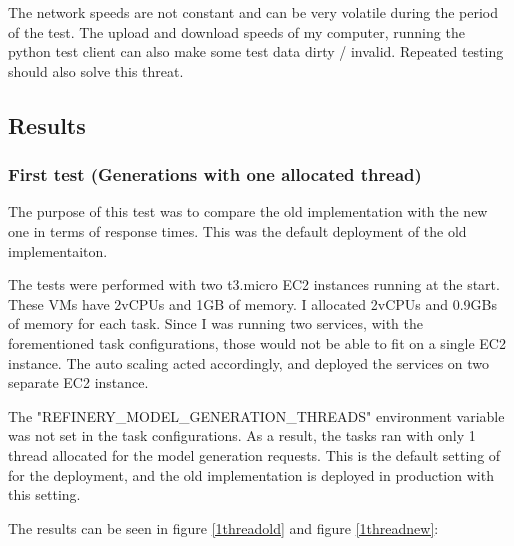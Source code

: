 			The network speeds are not constant and can be very volatile during the period of the test. The upload and download speeds of my computer, running the 
			python test client can also make some test data dirty / invalid.  Repeated testing should also solve this threat.

		\subsection{Results}
			\subsubsection{First test (Generations with one allocated thread)} \label{firsttest}
			The purpose of this test was to compare the old implementation with the new one in terms of response times. This was 
			the default deployment of the old implementaiton.

			The tests were performed with two t3.micro EC2 instances running at the start. These VMs have 2vCPUs and 1GB of memory. I allocated
			2vCPUs and 0.9GBs of memory for each task. Since I was running two services, with the forementioned task configurations, 
			those would not be able to fit on a single EC2 instance. The auto scaling acted accordingly, and deployed the services on two 
			separate EC2 instance. 

			The "REFINERY\_MODEL\_GENERATION\_THREADS" environment variable was not set in the task configurations. As a result, the tasks ran with only 1 thread
			allocated for the model generation requests.
			This is the default setting of for the deployment, and the old implementation is deployed in production with this setting.

			The results can be seen in figure \ref{1threadold} and figure \ref{1threadnew}:


